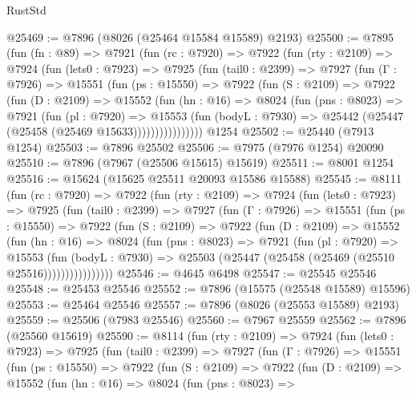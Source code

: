 \begin{lexlean}{RustStd}
\begin{coremodule}
@25469 := @7896 (@8026 (@25464 @15584 @15589) @2193)
@25500 := @7895
    (fun (fn : @89) =>
    @7921
      (fun (rc : @7920) =>
      @7922
        (fun (rty : @2109) =>
        @7924
          (fun (lets0 : @7923) =>
          @7925
            (fun (tail0 : @2399) =>
            @7927
              (fun (Γ : @7926) =>
              @15551
                (fun (ps : @15550) =>
                @7922
                  (fun (S : @2109) =>
                  @7922
                    (fun (D : @2109) =>
                    @15552
                      (fun (hn : @16) =>
                      @8024
                        (fun (pns : @8023) =>
                        @7921
                          (fun (pl : @7920) =>
                          @15553
                            (fun (bodyL : @7930) =>
                            @25442 (@25447 (@25458 (@25469 @15633))))))))))))))))
    @1254
@25502 := @25440 (@7913 @1254)
@25503 := @7896 @25502
@25506 := @7975 (@7976 @1254) @20090
@25510 := @7896 (@7967 (@25506 @15615) @15619)
@25511 := @8001 @1254
@25516 := @15624 (@15625 @25511 @20093 @15586 @15588)
@25545 := @8111
    (fun (rc : @7920) =>
    @7922
      (fun (rty : @2109) =>
      @7924
        (fun (lets0 : @7923) =>
        @7925
          (fun (tail0 : @2399) =>
          @7927
            (fun (Γ : @7926) =>
            @15551
              (fun (ps : @15550) =>
              @7922
                (fun (S : @2109) =>
                @7922
                  (fun (D : @2109) =>
                  @15552
                    (fun (hn : @16) =>
                    @8024
                      (fun (pns : @8023) =>
                      @7921
                        (fun (pl : @7920) =>
                        @15553
                          (fun (bodyL : @7930) =>
                          @25503 (@25447 (@25458 (@25469 (@25510 @25516))))))))))))))))
@25546 := @4645 @6498
@25547 := @25545 @25546
@25548 := @25453 @25546
@25552 := @7896 (@15575 (@25548 @15589) @15596)
@25553 := @25464 @25546
@25557 := @7896 (@8026 (@25553 @15589) @2193)
@25559 := @25506 (@7983 @25546)
@25560 := @7967 @25559
@25562 := @7896 (@25560 @15619)
@25590 := @8114
    (fun (rty : @2109) =>
    @7924
      (fun (lets0 : @7923) =>
      @7925
        (fun (tail0 : @2399) =>
        @7927
          (fun (Γ : @7926) =>
          @15551
            (fun (ps : @15550) =>
            @7922
              (fun (S : @2109) =>
              @7922
                (fun (D : @2109) =>
                @15552
                  (fun (hn : @16) =>
                  @8024
                    (fun (pns : @8023) =>

\end{coremodule}
\end{lexlean}
